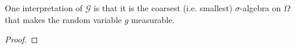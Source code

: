 \documentclass[11pt]{scrartcl}
\begin{document}
\begin{remark}
One interpretation of $\mathscr{G}$ is that it is the coarsest (i.e. smallest) $\sigma$-algebra on $\Omega$ that makes the random variable $g$ measurable. 
\end{remark}




\begin{exercise}

\end{exercise}

\begin{theorem}

\end{theorem}

\begin{lemma}

\end{lemma}
\begin{proof}

\end{proof}

\begin{definition}

\end{definition}




\end{document}
